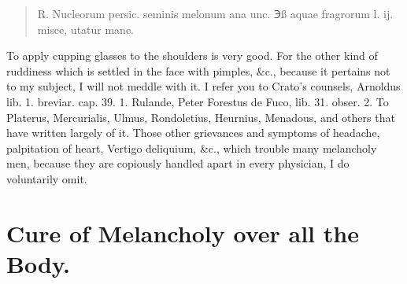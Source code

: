\begin{quote}
\begin{latin}
℞. Nucleorum persic. seminis melonum ana unc. ℈ß aquae fragrorum l. ij.
misce, utatur mane.
\end{latin}
\end{quote}

To apply cupping glasses to the shoulders is very good. For the
other kind of ruddiness which is settled in the face with pimples, \&c.,
because it pertains not to my subject, I will not meddle with it. I
refer you to Crato's counsels, Arnoldus lib. 1. breviar. cap. 39. 1.
Rulande, Peter Forestus de Fuco, lib. 31. obser. 2. To Platerus,
Mercurialis, Ulmus, Rondoletius, Heurnius, Menadous, and others that
have written largely of it.
Those other grievances and symptoms of headache, palpitation of heart,
Vertigo deliquium, \&c., which trouble many melancholy men, because they
are copiously handled apart in every physician, I do voluntarily omit.


\section{Cure of Melancholy over all the Body.}

